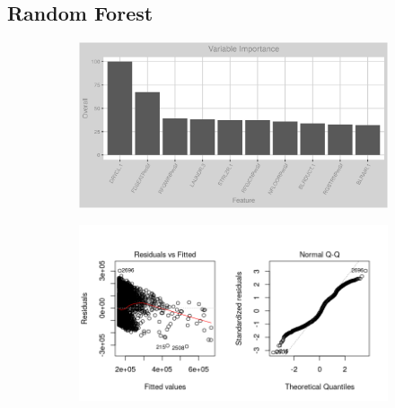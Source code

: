 \subsection{Random Forest}
\label{appendix:natural_gas:rf}
\begin{figure}[h]
\centering
\begin{subfigure}{1\textwidth}
\centering
\includegraphics[width=.99\textwidth, height=0.35\textheight]{Images/natural_gas_psf_rf_vars.png}
\end{subfigure}
\begin{subfigure}{1\textwidth}
\centering
\includegraphics[width=.99\textwidth, height=0.4\textheight]{Images/natural_gas_psf_rf_res_1.png}
\end{subfigure}
\end{figure}
\FloatBarrier
\newpage
